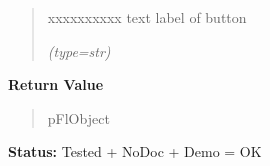 \begin{boxedminipage}{\funcwidth}
\begin{quote}
\begin{Ventry}{xxxxxxxxxx}
          text label of button

            {\it (type=str)}

        \end{Ventry}

      \end{quote}

      \textbf{Return Value}
    \vspace{-1ex}

      \begin{quote}
      pFlObject

      \end{quote}

\textbf{Status:} Tested + NoDoc + Demo = OK



    \end{boxedminipage}

    \label{xformslib:flbutton:fl_add_round3dbutton}

    \vspace{0.5ex}

